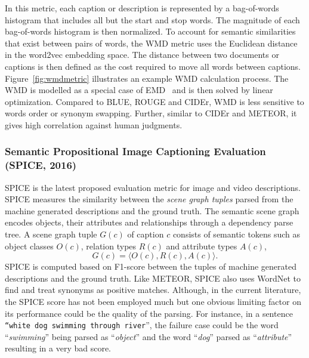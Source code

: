 \documentclass[10pt,journal,compsoc]{IEEEtran}
\begin{document}
In this metric, each caption or description is represented by a bag-of-words histogram that includes all but the start and stop words. The magnitude of each bag-of-words histogram is then normalized.
To account for semantic similarities that exist between pairs of words, the WMD metric uses the Euclidean distance in the word2vec embedding space. The distance between two documents or captions is then defined as the cost required to move all words between captions. Figure~\ref{fig:wmdmetric} illustrates an example WMD calculation process. %
The WMD is modelled as a special case of EMD~\cite{rubner2000earth} and is then solved by linear optimization. Compared to BLUE, ROUGE and CIDEr, WMD is less sensitive to words order or synonym swapping. Further, similar to CIDEr and METEOR, it gives high correlation against human judgments.

\subsubsection{Semantic Propositional Image Captioning Evaluation (SPICE, 2016)}
SPICE \cite{anderson2016spice} is the latest proposed evaluation metric for image and video descriptions. SPICE measures the similarity between the {\em scene graph tuples} parsed from the machine generated descriptions and the ground truth. The semantic scene graph encodes objects, their attributes and relationships through a dependency parse tree. A scene graph tuple $G(c)$ of caption $c$ consists of semantic tokens such as object classes $O(c)$, relation types $R(c)$ and attribute types $A(c)$,
$$G(c)=\langle O(c),R(c),A(c) \rangle .$$
SPICE is computed based on F1-score between the tuples of machine generated descriptions and the ground truth. Like METEOR, SPICE also uses WordNet to find and treat synonyms as positive matches. Although, in the current literature, the SPICE score has not been employed much but one obvious limiting factor on its performance could be the quality of the parsing. For instance, in a sentence {\tt ``white dog swimming through river}'', the failure case could be the word ``\textit{swimming}'' being parsed as ``\textit{object}'' and the word ``\textit{dog}'' parsed as ``\textit{attribute}'' resulting in a very bad score.
\end{document}
